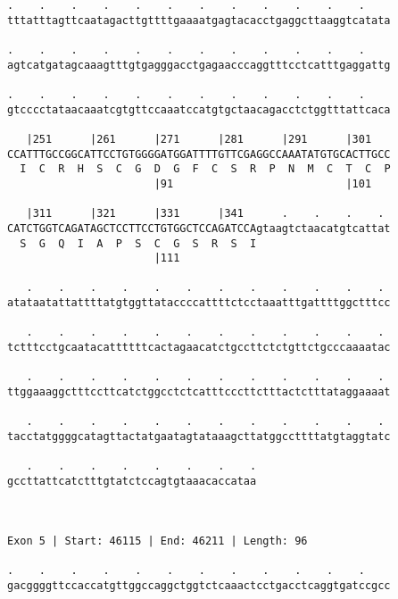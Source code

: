 \documentclass{article}
\begin{document}
\begin{Verbatim}
.    .    .    .    .    .    .    .    .    .    .    .    
tttatttagttcaatagacttgttttgaaaatgagtacacctgaggcttaaggtcatata
                                                            
.    .    .    .    .    .    .    .    .    .    .    .    
agtcatgatagcaaagtttgtgagggacctgagaacccaggtttcctcatttgaggattg
                                                            
.    .    .    .    .    .    .    .    .    .    .    .    
gtcccctataacaaatcgtgttccaaatccatgtgctaacagacctctggtttattcaca
                                                            
   |251      |261      |271      |281      |291      |301   
CCATTTGCCGGCATTCCTGTGGGGATGGATTTTGTTCGAGGCCAAATATGTGCACTTGCC
  I  C  R  H  S  C  G  D  G  F  C  S  R  P  N  M  C  T  C  P
                       |91                           |101   
  
   |311      |321      |331      |341      .    .    .    . 
CATCTGGTCAGATAGCTCCTTCCTGTGGCTCCAGATCCAgtaagtctaacatgtcattat
  S  G  Q  I  A  P  S  C  G  S  R  S  I                     
                       |111                                 
  
   .    .    .    .    .    .    .    .    .    .    .    . 
atataatattattttatgtggttataccccattttctcctaaatttgattttggctttcc
                                                            
   .    .    .    .    .    .    .    .    .    .    .    . 
tctttcctgcaatacattttttcactagaacatctgccttctctgttctgcccaaaatac
                                                            
   .    .    .    .    .    .    .    .    .    .    .    . 
ttggaaaggctttccttcatctggcctctcatttcccttctttactctttataggaaaat
                                                            
   .    .    .    .    .    .    .    .    .    .    .    . 
tacctatggggcatagttactatgaatagtataaagcttatggccttttatgtaggtatc
                                                            
   .    .    .    .    .    .    .    .
gccttattcatctttgtatctccagtgtaaacaccataa
                                       
                                       
 
Exon 5 | Start: 46115 | End: 46211 | Length: 96
 
.    .    .    .    .    .    .    .    .    .    .    .    
gacggggttccaccatgttggccaggctggtctcaaactcctgacctcaggtgatccgcc
                                                            

\end{Verbatim}
\end{document}
